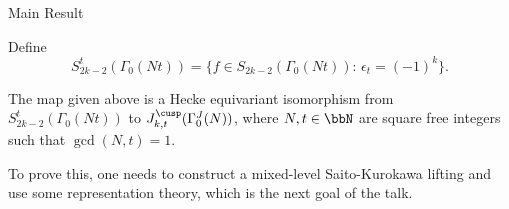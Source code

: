 \documentclass[mathserif,12pt]{beamer}
\begin{document}
\begin{frame}{Main Result}

Define
\begin{equation*}
S_{2k - 2}^{t}(\Gamma_0(Nt)) = \{ f \in S_{2k - 2}(\Gamma_0(Nt)) :\, \epsilon_t = (- 1)^k \}.
\end{equation*}
\pause
\begin{theorem}[Brown-L.]{1}
The map given above is a Hecke equivariant isomorphism from $S_{2k - 2}^{t}(\Gamma_0(Nt))$ to $J_{k,t}^{\cusp}(\Gamma_0^{J}(N))$,
where $N, t \in \bbN$ are square free integers such that $\gcd(N, t) = 1$.

\end{theorem}
\pause
To prove this, one needs to construct a mixed-level Saito-Kurokawa lifting and use some representation theory, which is the next goal of the talk.
\end{frame}

%
%
%
%
%
\end{document}
